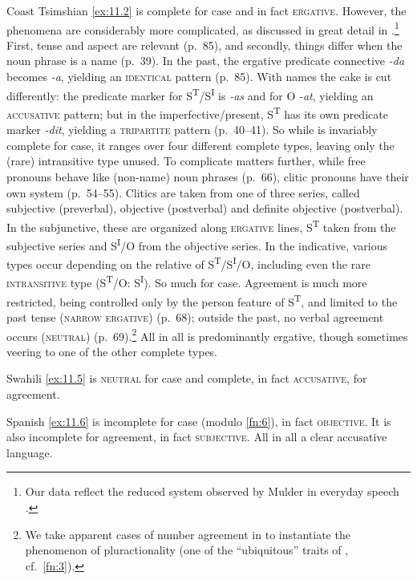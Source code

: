 \documentclass[output=paper]{langsci/langscibook}
\begin{document}
Coast Tsimshian \eqref{ex:11.2} is complete for case and in fact
\textsc{ergative}.  However, the phenomena are considerably more complicated,
as discussed in great detail in \citet{Mulder1994}.\footnote{Our data reflect
    the reduced system observed by Mulder in everyday speech
\citep[39]{Mulder1994}.} First, tense and aspect are relevant (p.\ 85), and
secondly, things differ when the noun phrase is a name (p.\ 39). In the past,
the ergative predicate connective \emph{-da} becomes \emph{-a}, yielding an
\textsc{identical} pattern (p.\ 85). With names the cake is cut differently:
the predicate marker for S\textsuperscript{T}/S\textsuperscript{I} is
\emph{-as} and for O \emph{-at}, yielding an \textsc{accusative} pattern; but
in the imperfective/present, S\textsuperscript{T} has its own predicate marker
\emph{-dit}, yielding a \textsc{tripartite} pattern (p.\ 40--41). So while
 is invariably complete for case, it ranges over four
different complete types, leaving only the (rare) intransitive type unused. To
complicate matters further, while free pronouns behave like (non-name) noun
phrases (p.\ 66), clitic pronouns have their own system (p.\ 54--55). Clitics
are taken from one of three series, called subjective (preverbal), objective
(postverbal) and definite objective (postverbal). In the subjunctive, these are
organized along \textsc{ergative} lines, S\textsuperscript{T} taken from the
subjective series and S\textsuperscript{I}/O from the objective series. In the
indicative, various types occur depending on the relative  of
S\textsuperscript{T}/S\textsuperscript{I}/O, including even the rare
\textsc{intransitive} type (S\textsuperscript{T}/O: S\textsuperscript{I}). So
much for  case. Agreement is much more restricted, being
controlled only by the person feature of S\textsuperscript{T}, and limited to
the past tense (\textsc{narrow ergative}) (p.\ 68); outside the past, no verbal
agreement occurs (\textsc{neutral}) (p.\ 69).\footnote{We take apparent cases of
    number agreement in  to instantiate the phenomenon of
pluractionality (one of the \enquote{ubiquitous}  traits of
\citealt{Queixalos2013}, cf.\ \cref{fn:3}).} All in all 
is predominantly ergative, though sometimes veering to one of the other
complete types.

Swahili \eqref{ex:11.5} is \textsc{neutral} for case and complete, in fact
\textsc{accusative}, for agreement.

Spanish \eqref{ex:11.6} is incomplete for case (modulo \cref{fn:6}), in fact \textsc{objective}.
It is also incomplete for agreement, in fact \textsc{subjective}. All in all a
clear accusative language.
\end{document}
